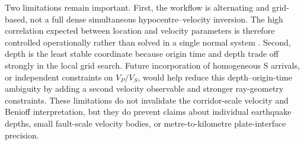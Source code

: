 \documentclass[review,authoryear]{elsarticle}
\begin{document}
Two limitations remain important. First, the workflow is alternating and grid-based, not a full dense simultaneous hypocentre--velocity inversion. The high correlation expected between location and velocity parameters is therefore controlled operationally rather than solved in a single normal system \citep{Crosson1976,Thurber1983}. Second, depth is the least stable coordinate because origin time and depth trade off strongly in the local grid search. Future incorporation of homogeneous S arrivals, or independent constraints on $V_P/V_S$, would help reduce this depth--origin-time ambiguity by adding a second velocity observable and stronger ray-geometry constraints. These limitations do not invalidate the corridor-scale velocity and Benioff interpretation, but they do prevent claims about individual earthquake depths, small fault-scale velocity bodies, or metre-to-kilometre plate-interface precision.
\end{document}
